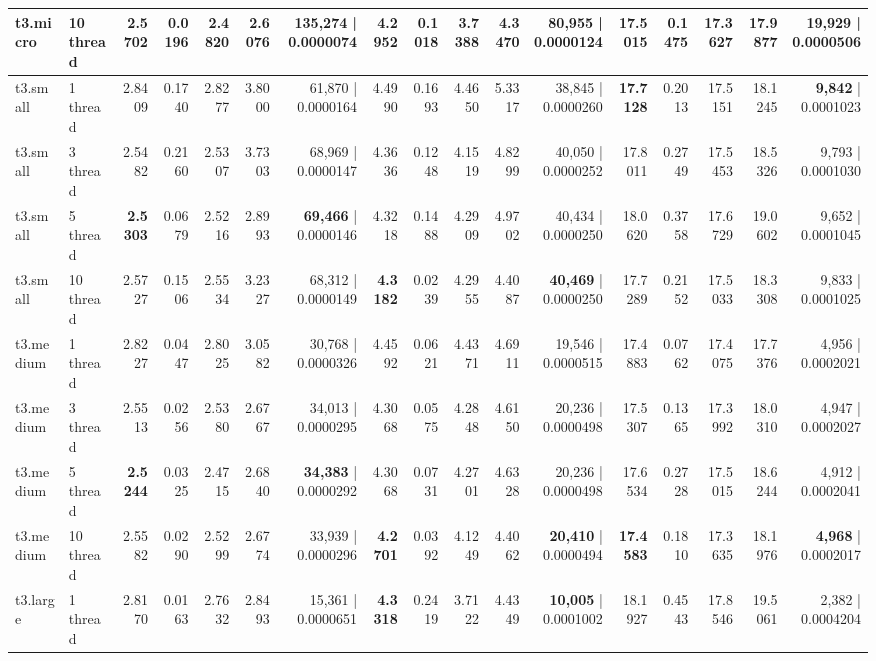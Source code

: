 \documentclass[conference]{IEEEtran}
\begin{document}
\begin{table}[h]
{\begin{tabular}{ll|rrrrr|rrrrr|rrrrr}
				t3.micro & 10 thread & 2.5702 & 0.0196 & 2.4820 & 2.6076 & 135,274 | 0.0000074 & \textbf{4.2952} & 0.1018 & 3.7388 & 4.3470 & \textbf{80,955} | 0.0000124 & \textbf{17.5015} & 0.1475 & 17.3627 & 17.9877 & \textbf{19,929} | 0.0000506 \\
				\midrule
				t3.small & 1 thread & 2.8409 & 0.1740 & 2.8277 & 3.8000 & 61,870 | 0.0000164 & 4.4990 & 0.1693 & 4.4650 & 5.3317 & 38,845 | 0.0000260 & \textbf{17.7128} & 0.2013 & 17.5151 & 18.1245 & \textbf{9,842} | 0.0001023 \\
				t3.small & 3 thread & 2.5482 & 0.2160 & 2.5307 & 3.7303 & 68,969 | 0.0000147 & 4.3636 & 0.1248 & 4.1519 & 4.8299 & 40,050 | 0.0000252 & 17.8011 & 0.2749 & 17.5453 & 18.5326 & 9,793 | 0.0001030 \\
				t3.small & 5 thread & \textbf{2.5303} & 0.0679 & 2.5216 & 2.8993 & \textbf{69,466} | 0.0000146 & 4.3218 & 0.1488 & 4.2909 & 4.9702 & 40,434 | 0.0000250 & 18.0620 & 0.3758 & 17.6729 & 19.0602 & 9,652 | 0.0001045 \\
				t3.small & 10 thread & 2.5727 & 0.1506 & 2.5534 & 3.2327 & 68,312 | 0.0000149 & \textbf{4.3182} & 0.0239 & 4.2955 & 4.4087 & \textbf{40,469} | 0.0000250 & 17.7289 & 0.2152 & 17.5033 & 18.3308 & 9,833 | 0.0001025 \\
				\midrule
				t3.medium & 1 thread & 2.8227 & 0.0447 & 2.8025 & 3.0582 & 30,768 | 0.0000326 & 4.4592 & 0.0621 & 4.4371 & 4.6911 & 19,546 | 0.0000515 & 17.4883 & 0.0762 & 17.4075 & 17.7376 & 4,956 | 0.0002021 \\
				t3.medium & 3 thread & 2.5513 & 0.0256 & 2.5380 & 2.6767 & 34,013 | 0.0000295 & 4.3068 & 0.0575 & 4.2848 & 4.6150 & 20,236 | 0.0000498 & 17.5307 & 0.1365 & 17.3992 & 18.0310 & 4,947 | 0.0002027 \\
				t3.medium & 5 thread & \textbf{2.5244} & 0.0325 & 2.4715 & 2.6840 & \textbf{34,383} | 0.0000292 & 4.3068 & 0.0731 & 4.2701 & 4.6328 & 20,236 | 0.0000498 & 17.6534 & 0.2728 & 17.5015 & 18.6244 & 4,912 | 0.0002041 \\
				t3.medium & 10 thread & 2.5582 & 0.0290 & 2.5299 & 2.6774 & 33,939 | 0.0000296 & \textbf{4.2701} & 0.0392 & 4.1249 & 4.4062 & \textbf{20,410} | 0.0000494 & \textbf{17.4583} & 0.1810 & 17.3635 & 18.1976 & \textbf{4,968} | 0.0002017 \\
				\midrule
				t3.large & 1 thread & 2.8170 & 0.0163 & 2.7632 & 2.8493 & 15,361 | 0.0000651 & \textbf{4.3318} & 0.2419 & 3.7122 & 4.4349 & \textbf{10,005} | 0.0001002 & 18.1927 & 0.4543 & 17.8546 & 19.5061 & 2,382 | 0.0004204 \\

\end{tabular}}
\end{table}
\end{document}
